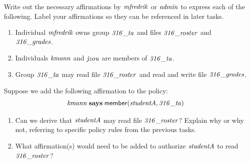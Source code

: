 \documentclass[11pt]{article}
\begin{document}
\begin{task}[10 points]\rm
  Write out the necessary affirmations by $\mathit{mfredrik}$ or $\mathit{admin}$ to
  express each of the following.  Label your affirmations so they
  can be referenced in later tasks.
  \begin{enumerate}
  \item Individual $\mathit{mfredrik}$ owns group $\mathit{316\_ta}$
    and files $\mathit{316\_roster}$ and $\mathit{316\_grades}$.
  \item Individuals $\mathit{kmann}$ and $\mathit{jzou}$ are members of $\mathit{316\_ta}$.
  \item Group $\mathit{316\_ta}$ may read file $\mathit{316\_roster}$ and read and write file
    $\mathit{316\_grades}$.
  \end{enumerate}
\end{task}

\begin{task}[10 points]\rm
  Suppose we add the following affirmation to the policy:
  \[
    \mathit{kmann} \mathrel{\mathbf{says}} \mathsf{member}(\mathit{studentA}, \mathit{316\_ta})
  \]
  \begin{enumerate}
  \item Can we derive that $\mathit{studentA}$ may read file $\mathit{316\_roster}$?
    Explain why or why not, referring to specific policy rules from the
    previous tasks.
  \item What affirmation(s) would need to be added to authorize $\mathit{studentA}$
    to read $\mathit{316\_roster}$?
  \end{enumerate}
\end{task}
\end{document}
